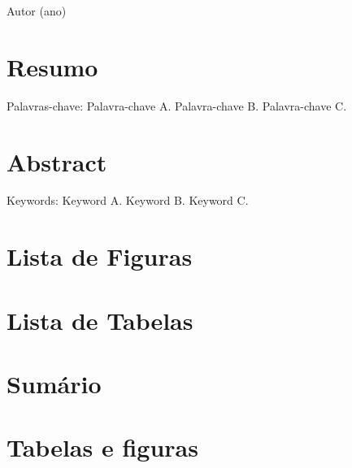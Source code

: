 \documentclass{abntexto}
\def\Direita{\noindent\hfill}
\begin{document}

\leavevmode\vfil

\Direita
\begin{minipage}{3cm}
    \linebreak
    Autor (ano)
\end{minipage}
\newpage


\nonum\notoc\section{Resumo}
\noindent \lipsum[1]\Enter

Palavras-chave: Palavra-chave A. Palavra-chave B. Palavra-chave C.
\newpage


\nonum\notoc\section{Abstract}
\noindent \lipsum[1]\Enter

Keywords: Keyword A. Keyword B. Keyword C.
\newpage


\nonum\notoc\section{Lista de Figuras}
\makelof
\newpage

\nonum\notoc\section{Lista de Tabelas}
\makelot
\newpage

\nonum\notoc\section{Sumário}
\maketoc

\section{Tabelas e figuras}
\end{document}
